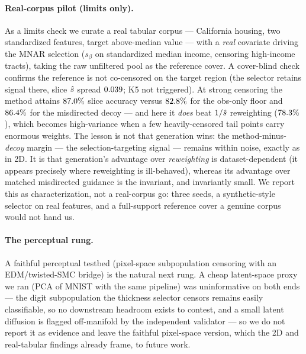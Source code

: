 \paragraph{Real-corpus pilot (limits only).} As a limits check we curate a real
tabular corpus --- California housing, two standardized features, target
above-median value --- with a \emph{real} covariate driving the MNAR selection
($s_\beta$ on standardized median income, censoring high-income tracts), taking
the raw unfiltered pool as the reference cover. A cover-blind check confirms the
reference is not co-censored on the target region (the selector retains signal
there, slice $\hat s$ spread $0.039$; K5 not triggered). At strong
censoring the method attains $87.0\%$ slice accuracy versus
$82.8\%$ for the obs-only floor and $86.4\%$ for the
misdirected decoy --- and here it \emph{does} beat $1/\hat s$ reweighting
($78.3\%$), which becomes high-variance when a few heavily-censored
tail points carry enormous weights. The lesson is not that generation wins: the
method-minus-\emph{decoy} margin --- the selection-targeting signal --- remains
within noise, exactly as in 2D. It is that generation's advantage over
\emph{reweighting} is dataset-dependent (it appears precisely where reweighting
is ill-behaved), whereas its advantage over matched misdirected guidance is the
invariant, and invariantly small. We report this as characterization, not a
real-corpus go: three seeds, a synthetic-style selector on real features, and a
full-support reference cover a genuine corpus would not hand us.

\paragraph{The perceptual rung.} A faithful perceptual testbed (pixel-space
subpopulation censoring with an EDM/twisted-SMC bridge) is the natural next rung.
A cheap latent-space proxy we ran (PCA of MNIST with the same pipeline) was
uninformative on both ends --- the digit subpopulation the thickness selector
censors remains easily classifiable, so no downstream headroom exists to
contest, and a small latent diffusion is flagged off-manifold by the independent
validator --- so we do not report it as evidence and leave the faithful
pixel-space version, which the 2D and real-tabular findings already frame, to
future work.
